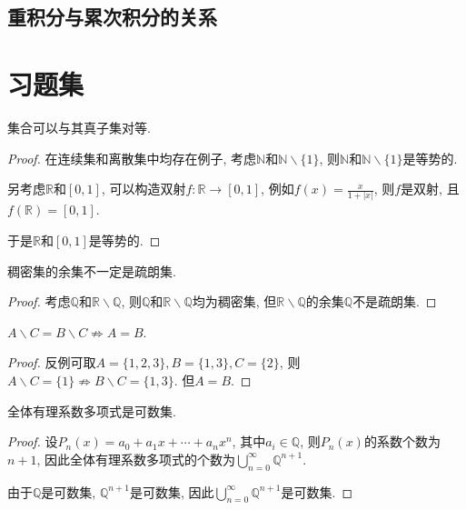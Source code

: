 \documentclass[theorem=false,mathfont=none,openany,sub3section]{easybook}
\begin{document}
\newpage

\section{重积分与累次积分的关系}


\newpage

\chapter{习题集}

\begin{example}
  集合可以与其真子集对等.
\end{example}

\begin{proof}
  在连续集和离散集中均存在例子, 考虑$\mathbb{N}$和$\mathbb{N}\backslash \{1\}$, 则$\mathbb{N}$和$\mathbb{N}\backslash \{1\}$是等势的.\par
  另考虑$\mathbb{R}$和$[0,1]$, 可以构造双射$f:\mathbb{R}\rightarrow [0,1]$, 例如$f(x)=\frac{x}{1+|x|}$, 则$f$是双射, 且$f(\mathbb{R})=[0,1]$.\par
  于是$\mathbb{R}$和$[0,1]$是等势的.\par
\end{proof}

\begin{example}
  稠密集的余集不一定是疏朗集.
\end{example}

\begin{proof}
  考虑$\mathbb{Q}$和$\mathbb{R}\backslash \mathbb{Q}$, 则$\mathbb{Q}$和$\mathbb{R}\backslash \mathbb{Q}$均为稠密集, 但$\mathbb{R}\backslash \mathbb{Q}$的余集$\mathbb{Q}$不是疏朗集.\par
\end{proof}

\begin{example}
  $A \backslash C =  B \backslash C \nRightarrow A = B$.
\end{example}

\begin{proof}
  反例可取$A=\{1,2,3\}, B=\{1,3\}, C=\{2\}$, 则$A \backslash C = \{1\} \nRightarrow B \backslash C = \{1,3\}$. 但$A=B$.\par
\end{proof}

\begin{example}
  全体有理系数多项式是可数集.
\end{example}

\begin{proof}
  设$P_n(x)=a_0+a_1x+\cdots+a_nx^n$, 其中$a_i\in \mathbb{Q}$, 则$P_n(x)$的系数个数为$n+1$, 因此全体有理系数多项式的个数为$\bigcup_{n=0}^{\infty}\mathbb{Q}^{n+1}$.\par
  由于$\mathbb{Q}$是可数集, $\mathbb{Q}^{n+1}$是可数集, 因此$\bigcup_{n=0}^{\infty}\mathbb{Q}^{n+1}$是可数集.\par
\end{proof}
\end{document}
